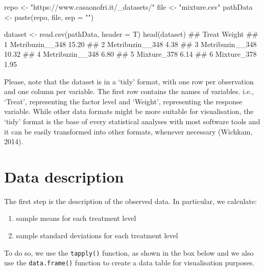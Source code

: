 \documentclass[a4paper,12pt,oneside]{book}
\providecommand{\tightlist}{%
  \setlength{\itemsep}{0pt}\setlength{\parskip}{0pt}}
\newenvironment{Shaded}{\begin{snugshade}}{\end{snugshade}}
\newcommand{\StringTok}[1]{#1}
\newcommand{\DocumentationTok}[1]{#1}
\newcommand{\OtherTok}[1]{#1}
\newcommand{\FunctionTok}[1]{#1}
\newcommand{\AttributeTok}[1]{#1}
\newcommand{\NormalTok}[1]{#1}
\begin{document}
\vspace{12pt}

\begin{Shaded}
\begin{Highlighting}[]
\NormalTok{repo }\OtherTok{\textless{}{-}} \StringTok{"https://www.casaonofri.it/\_datasets/"}
\NormalTok{file }\OtherTok{\textless{}{-}} \StringTok{"mixture.csv"}
\NormalTok{pathData }\OtherTok{\textless{}{-}} \FunctionTok{paste}\NormalTok{(repo, file, }\AttributeTok{sep =} \StringTok{""}\NormalTok{)}

\NormalTok{dataset }\OtherTok{\textless{}{-}} \FunctionTok{read.csv}\NormalTok{(pathData, }\AttributeTok{header =}\NormalTok{ T)}
\FunctionTok{head}\NormalTok{(dataset)}
\DocumentationTok{\#\#             Treat Weight}
\DocumentationTok{\#\# 1 Metribuzin\_\_348  15.20}
\DocumentationTok{\#\# 2 Metribuzin\_\_348   4.38}
\DocumentationTok{\#\# 3 Metribuzin\_\_348  10.32}
\DocumentationTok{\#\# 4 Metribuzin\_\_348   6.80}
\DocumentationTok{\#\# 5     Mixture\_378   6.14}
\DocumentationTok{\#\# 6     Mixture\_378   1.95}
\end{Highlighting}
\end{Shaded}

Please, note that the dataset is in a `tidy' format, with one row per observation and one column per variable. The first row contains the names of variables. i.e., `Treat', representing the factor level and `Weight', representing the response variable. While other data formats might be more suitable for visualisation, the `tidy' format is the base of every statistical analyses with most software tools and it can be easily transformed into other formats, whenever necessary (Wichkam, 2014).

\hypertarget{data-description}{%
\section{Data description}\label{data-description}}

The first step is the description of the observed data. In particular, we calculate:

\begin{enumerate}
\def\labelenumi{\arabic{enumi}.}
\tightlist
\item
  sample means for each treatment level
\item
  sample standard deviations for each treatment level
\end{enumerate}

To do so, we use the \texttt{tapply()} function, as shown in the box below and we also use the \texttt{data.frame()} function to create a data table for visualisation purposes.
\end{document}

